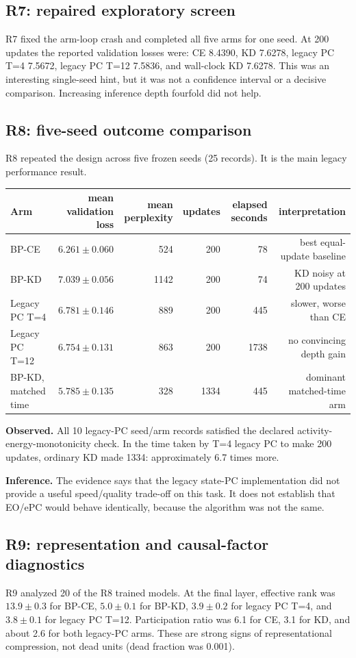 \documentclass[10pt,a4paper]{article}
\newcommand{\obs}{\textbf{Observed.} }
\newcommand{\inferr}{\textbf{Inference.} }
\begin{document}
\subsection{R7: repaired exploratory screen}
R7 fixed the arm-loop crash and completed all five arms for one seed.  At 200
updates the reported validation losses were: CE 8.4390, KD 7.6278, legacy PC
T=4 7.5672, legacy PC T=12 7.5836, and wall-clock KD 7.6278.  This was an
interesting single-seed hint, but it was not a confidence interval or a
decisive comparison.  Increasing inference depth fourfold did not help.

\subsection{R8: five-seed outcome comparison}
R8 repeated the design across five frozen seeds (25 records).  It is the main
legacy performance result.

\begin{center}
\small
\begin{tabular}{lrrrrr}
\toprule
Arm & mean validation loss & mean perplexity & updates & elapsed seconds & interpretation \\
\midrule
BP-CE & $6.261\pm0.060$ & 524 & 200 & 78 & best equal-update baseline \\
BP-KD & $7.039\pm0.056$ & 1142 & 200 & 74 & KD noisy at 200 updates \\
Legacy PC T=4 & $6.781\pm0.146$ & 889 & 200 & 445 & slower, worse than CE \\
Legacy PC T=12 & $6.754\pm0.131$ & 863 & 200 & 1738 & no convincing depth gain \\
BP-KD, matched time & $5.785\pm0.135$ & 328 & 1334 & 445 & dominant matched-time arm \\
\bottomrule
\end{tabular}
\end{center}

\obs All 10 legacy-PC seed/arm records satisfied the declared
activity-energy-monotonicity check.  In the time taken by T=4 legacy PC to
make 200 updates, ordinary KD made 1334: approximately 6.7 times more.

\inferr The evidence says that the legacy state-PC implementation did not
provide a useful speed/quality trade-off on this task.  It does not establish
that EO/ePC would behave identically, because the algorithm was not the same.

\subsection{R9: representation and causal-factor diagnostics}
R9 analyzed 20 of the R8 trained models.  At the final layer, effective rank
was $13.9\pm0.3$ for BP-CE, $5.0\pm0.1$ for BP-KD, $3.9\pm0.2$ for legacy PC
T=4, and $3.8\pm0.1$ for legacy PC T=12.  Participation ratio was 6.1 for
CE, 3.1 for KD, and about 2.6 for both legacy-PC arms.  These are strong signs
of representational compression, not dead units (dead fraction was 0.001).
\end{document}

